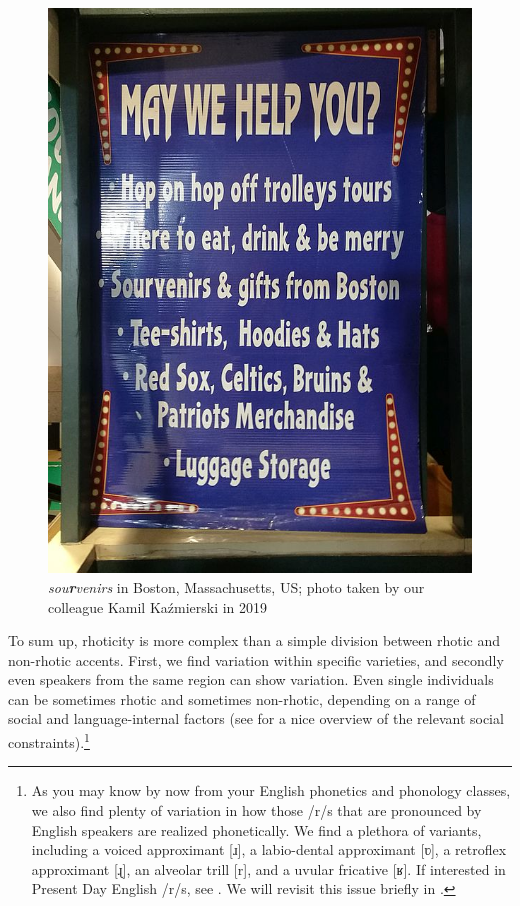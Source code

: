 \begin{figure}
    \includegraphics[scale=0.55]{chapters/img/sourvenirs.jpg}
    \caption{\textit{sou\textbf{r}venirs} in Boston, Massachusetts, US; photo taken by our colleague Kamil Kaźmierski in 2019}
    \label{fig:sourvenirs}
\end{figure}

\newpage
To sum up, rhoticity is more complex than a simple division between rhotic and non-rhotic accents. First, we find variation within specific varieties, and secondly even speakers from the same region can show variation. Even single individuals can be sometimes rhotic and sometimes non-rhotic, depending on a range of social and language-internal factors (see \citet{Becker2014} for a nice overview of the relevant social constraints).\footnote{As you may know by now from your English phonetics and phonology classes, we also find plenty of variation in how those /r/s that are pronounced by English speakers are realized phonetically. We find a plethora of variants, including a voiced approximant {[}ɹ{]}, a labio-dental approximant {[}ʋ{]}, a retroflex approximant {[}ɻ{]}, an alveolar trill {[}r{]}, and a uvular fricative {[}ʁ{]}. If interested in Present Day English /r/s, see \citet{Wells1982b}. We will revisit this issue briefly in .}

